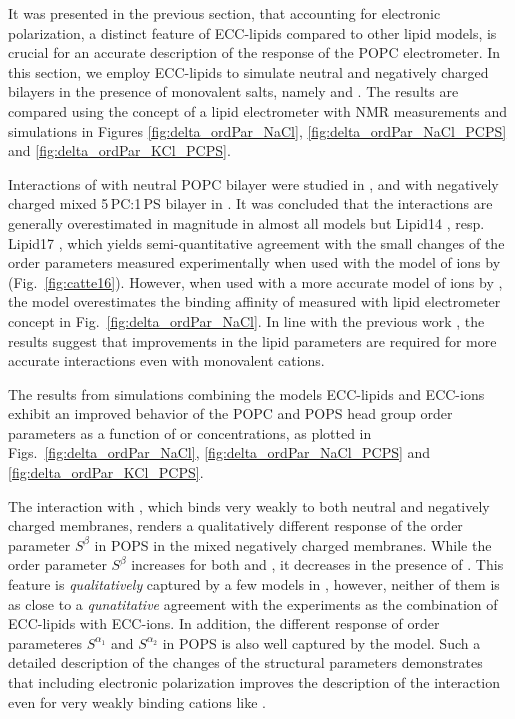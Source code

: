 It was presented in the previous section,
that accounting for electronic polarization,
a distinct feature of ECC-lipids compared to other lipid models, 
is crucial for an accurate description of the response of the POPC electrometer. 
In this section,
we employ ECC-lipids to simulate neutral and negatively charged bilayers 
in the presence of monovalent salts, namely  and . 
The results are compared using the concept of a lipid electrometer 
with NMR measurements and simulations in Figures \ref{fig:delta_ordPar_NaCl}, \ref{fig:delta_ordPar_NaCl_PCPS} and \ref{fig:delta_ordPar_KCl_PCPS}. 

Interactions of  with neutral POPC bilayer were studied in \citep{catte16}, 
and with negatively charged mixed 5\,PC:1\,PS bilayer in \citep{nmrlipids_proj4}. 
It was concluded that the interactions are generally overestimated in magnitude in almost all models 
but Lipid14 \citep{dickson14}, resp. Lipid17 \citep{lipid17-future}, 
which yields semi-quantitative agreement with the small changes of the order parameters measured experimentally
when used with the model of ions by \citet{aqvist90} (Fig.~\ref{fig:catte16}). 
However, when used with a more accurate model of ions by \citet{Pluharova2014, martinek17},
the model overestimates the binding affinity of 
measured with lipid electrometer concept in Fig.~\ref{fig:delta_ordPar_NaCl}. 
In line with the previous work \citep{catte16}, the results suggest that improvements 
in the lipid parameters are required for more accurate interactions even with monovalent cations. 

The results from simulations combining the models ECC-lipids \citep{melcr18} and ECC-ions \citep{martinek17, kohagen16, Pluharova2014} 
exhibit an improved behavior of the POPC and POPS head group order parameters as a function of  or  concentrations, 
as plotted in Figs.~\ref{fig:delta_ordPar_NaCl}, \ref{fig:delta_ordPar_NaCl_PCPS} and \ref{fig:delta_ordPar_KCl_PCPS}. 

The interaction with , which binds very weakly to both neutral and negatively charged membranes, 
renders a qualitatively different response of the order parameter $S^\beta$ in POPS in the mixed negatively charged membranes. 
While the order parameter $S^\beta$ increases for both  and ,
it decreases in the presence of .
This feature is \emph{qualitatively} captured by a few models in \citep{nmrlipids_proj4},
however, neither of them is as close to a \emph{qunatitative} agreement with the experiments 
as the combination of ECC-lipids with ECC-ions. 
In addition, the different response of order parameteres $S^{\alpha _1}$ and $S^{\alpha _2}$ in POPS is also well captured by the model. 
Such a detailed description of the changes of the structural parameters 
demonstrates that including electronic polarization
improves the description of the interaction even for very weakly binding cations like . 




